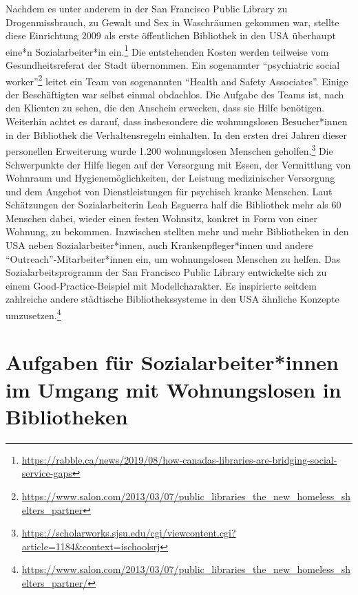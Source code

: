\documentclass[a4paper,
fontsize=11pt,
oneside,
numbers=noperiodatend,
parskip=half-,
bibliography=totoc,
final
]{scrartcl}
\begin{document}
Nachdem es unter anderem in der San Francisco Public Library zu
Drogenmissbrauch, zu Gewalt und Sex in Waschräumen gekommen war, stellte
diese Einrichtung 2009 als erste öffentlichen Bibliothek in den USA
überhaupt eine*n Sozialarbeiter*in ein.\footnote{\url{https://rabble.ca/news/2019/08/how-canadas-libraries-are-bridging-social-service-gaps}}
Die entstehenden Kosten werden teilweise vom Gesundheitsreferat der
Stadt übernommen. Ein sogenannter \enquote{psychiatric social
worker}\footnote{\url{https://www.salon.com/2013/03/07/public_libraries_the_new_homeless_shelters_partner}}
leitet ein Team von sogenannten \enquote{Health and Safety Associates}.
Einige der Beschäftigten war selbst einmal obdachlos. Die Aufgabe des
Teams ist, nach den Klienten zu sehen, die den Anschein erwecken, dass
sie Hilfe benötigen. Weiterhin achtet es darauf, dass insbesondere die
wohnungslosen Besucher*innen in der Bibliothek die Verhaltensregeln
einhalten. In den ersten drei Jahren dieser personellen Erweiterung
wurde 1.200 wohnungslosen Menschen geholfen.\footnote{\url{https://scholarworks.sjsu.edu/cgi/viewcontent.cgi?article=1184\&context=ischoolsrj}}
Die Schwerpunkte der Hilfe liegen auf der Versorgung mit Essen, der
Vermittlung von Wohnraum und Hygienemöglichkeiten, der Leistung
medizinischer Versorgung und dem Angebot von Dienstleistungen für
psychisch kranke Menschen. Laut Schätzungen der Sozialarbeiterin Leah
Esguerra half die Bibliothek mehr als 60 Menschen dabei, wieder einen
festen Wohnsitz, konkret in Form von einer Wohnung, zu bekommen.
Inzwischen stellten mehr und mehr Bibliotheken in den USA neben
Sozialarbeiter*innen, auch Krankenpfleger*innen und andere
\enquote{Outreach}-Mitarbeiter*innen ein, um wohnungslosen Menschen zu
helfen. Das Sozialarbeitsprogramm der San Francisco Public Library
entwickelte sich zu einem Good-Practice-Beispiel mit Modellcharakter. Es
inspirierte seitdem zahlreiche andere städtische Bibliothekssysteme in
den USA ähnliche Konzepte umzusetzen.\footnote{\url{https://www.salon.com/2013/03/07/public_libraries_the_new_homeless_shelters_partner/}}

\hypertarget{aufgaben-fuxfcr-sozialarbeiterinnen-im-umgang-mit-wohnungslosen-in-bibliotheken}{%
\section{Aufgaben für Sozialarbeiter*innen im Umgang mit
Wohnungslosen in
Bibliotheken}\label{aufgaben-fuxfcr-sozialarbeiterinnen-im-umgang-mit-wohnungslosen-in-bibliotheken}}
\end{document}
